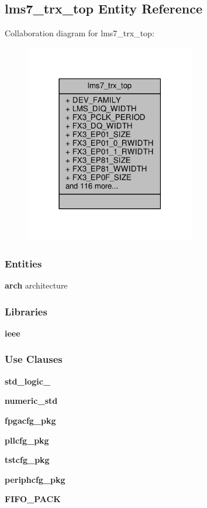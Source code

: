 \subsection{lms7\+\_\+trx\+\_\+top Entity Reference}
\label{classlms7__trx__top}


Collaboration diagram for lms7\+\_\+trx\+\_\+top\+:\nopagebreak
\begin{figure}[H]
\begin{center}
\leavevmode
\includegraphics[width=210pt]{dc/d33/classlms7__trx__top__coll__graph}
\end{center}
\end{figure}
\subsubsection*{Entities}
\begin{DoxyCompactItemize}
\item 
{\bf arch} architecture
\end{DoxyCompactItemize}
\subsubsection*{Libraries}
 \begin{DoxyCompactItemize}
\item 
{\bf ieee} 
\end{DoxyCompactItemize}
\subsubsection*{Use Clauses}
 \begin{DoxyCompactItemize}
\item 
{\bf std\+\_\+logic\+\_}   
\item 
{\bf numeric\+\_\+std}   
\item 
{\bf fpgacfg\+\_\+pkg}   
\item 
{\bf pllcfg\+\_\+pkg}   
\item 
{\bf tstcfg\+\_\+pkg}   
\item 
{\bf periphcfg\+\_\+pkg}   
\item 
{\bf F\+I\+F\+O\+\_\+\+P\+A\+CK}   
\end{DoxyCompactItemize}
